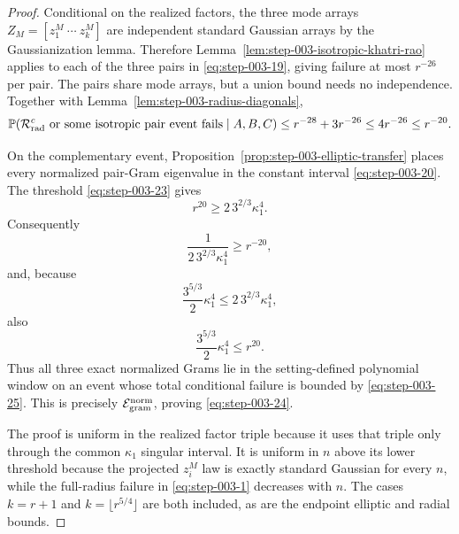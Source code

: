 \begin{proof}
Conditional on the realized factors, the three
mode arrays \(Z_M=[z_1^M\ \cdots\ z_k^M]\) are independent standard
Gaussian arrays by the Gaussianization lemma. Therefore
Lemma~\ref{lem:step-003-isotropic-khatri-rao} applies to each of the three
pairs in \eqref{eq:step-003-19}, giving failure at most \(r^{-26}\) per pair. The pairs share
mode arrays, but a union bound needs no independence. Together with
Lemma~\ref{lem:step-003-radius-diagonals},
\begin{equation}
  \mathbb P\!\left(
    \mathcal R_{\rm rad}^c
    \ \text{or some isotropic pair event fails}
    \mid A,B,C
  \right)
  \le r^{-28}+3r^{-26}
  \le4r^{-26}
  \le r^{-20}.                                             \label{eq:step-003-25}
\end{equation}

On the complementary event, Proposition~\ref{prop:step-003-elliptic-transfer}
places every normalized pair-Gram eigenvalue in the constant interval \eqref{eq:step-003-20}.
The threshold \eqref{eq:step-003-23} gives
\begin{equation}
  r^{20}\ge2\,3^{2/3}\kappa_1^4.                          \label{eq:step-003-26}
\end{equation}
Consequently
\begin{equation}
  \frac1{2\,3^{2/3}\kappa_1^4}\ge r^{-20},               \label{eq:step-003-27}
\end{equation}
and, because
\[
  \frac{3^{5/3}}2\kappa_1^4
  \le2\,3^{2/3}\kappa_1^4,
\]
also
\begin{equation}
  \frac{3^{5/3}}2\kappa_1^4\le r^{20}.                   \label{eq:step-003-28}
\end{equation}
Thus all three exact normalized Grams lie in the setting-defined polynomial
window on an event whose total conditional failure is bounded by \eqref{eq:step-003-25}. This
is precisely \(\mathcal E_{\rm gram}^{\rm norm}\), proving \eqref{eq:step-003-24}.

The proof is uniform in the realized factor triple because it uses that triple
only through the common \(\kappa_1\) singular interval. It is uniform in
\(n\) above its lower threshold because the projected \(z_i^M\) law is exactly
standard Gaussian for every \(n\), while the full-radius failure in \eqref{eq:step-003-1}
decreases with \(n\). The cases \(k=r+1\) and
\(k=\lfloor r^{5/4}\rfloor\) are both included, as are the endpoint elliptic
and radial bounds. 

\end{proof}

